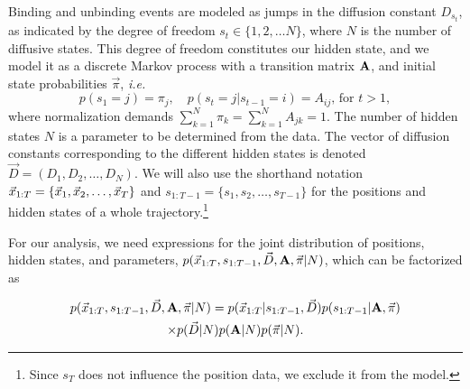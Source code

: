 Binding and unbinding events are modeled as jumps in the diffusion
constant $D_{s_t}$, as indicated by the degree of freedom
\mbox{$s_t\in\{1,2,\ldots N\}$}, where $N$ is the number of diffusive 
states. This degree of freedom constitutes our hidden state, and we
model it as a discrete Markov process with a transition matrix
$\mathbf{A}$, and initial state probabilities
$\vec{\pi}$, \textit{i.e.}
\begin{equation}\label{eq:Aij}
p(s_1=j)=\pi_j,\quad 
p(s_t=j|s_{t-1}=i)=A_{ij}\text{, for $t>1$},
\end{equation}
where normalization demands
$\sum_{k=1}^N\pi_k=\sum_{k=1}^NA_{jk}=1$. The number of hidden states
$N$ is a parameter to be determined from the data.  The vector of
diffusion constants corresponding to the different hidden states is
denoted $\vec D=(D_1,D_2,\ldots,D_N)$. We will also use the
shorthand notation $\vec{x}_{1:T}=\{\vec{x}_1,\vec{x}_2,\ldots , \vec{x}_T\}$ and
$s_{1:T-1}=\{s_1,s_2,\ldots,s_{T-1}\}$ for the positions and hidden
states of a whole trajectory.\footnote{Since $s_T$ does not influence
the position data, we exclude it from the model.}

For our analysis, we need expressions for the joint distribution of
positions, hidden states, and parameters,
$p(\vec{x}_{1:T},s_{1:T-1},\vec{D},\mathbf{A},\vec\pi|N)$, which can be
factorized as

\begin{multline}\label{eq:efactor1}
p(\vec{x}_{1:T},s_{1:T-1},\vec{D},\mathbf{A},\vec\pi|N)
=p(\vec{x}_{1:T}|s_{1:T-1},\vec{D})
p(s_{1:T-1}|\mathbf{A},\vec\pi)\\
\times p(\vec{D}|N)
p(\mathbf{A}|N)
p(\vec\pi|N).
\end{multline}

